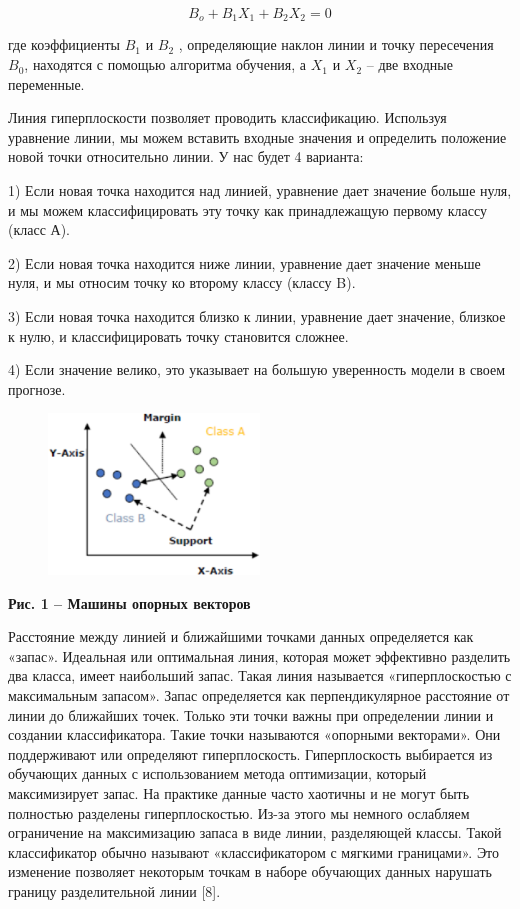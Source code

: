 \begin{equation}
	B_o+B_1X_1+B_2X_2=0
\end{equation}

где коэффициенты $B_1$ и $B_2$ , определяющие наклон линии и точку
пересечения $B_0$, находятся с помощью алгоритма обучения, а $X_1$ и $X_2$ -- две входные переменные.

Линия гиперплоскости позволяет проводить классификацию. Используя
уравнение линии, мы можем вставить входные значения и определить
положение новой точки относительно линии. У нас будет 4 варианта:

1) Если новая точка находится над линией, уравнение дает значение больше
нуля, и мы можем классифицировать эту точку как принадлежащую первому
классу (класс А).

2) Если новая точка находится ниже линии, уравнение дает значение меньше
нуля, и мы относим точку ко второму классу (классу B).

3) Если новая точка находится близко к линии, уравнение дает значение,
близкое к нулю, и классифицировать точку становится сложнее.

4) Если значение велико, это указывает на большую уверенность модели в
своем прогнозе.

\begin{figure}[H]
	\centering
	\includegraphics[width=0.5\textwidth]{assets/110}
	\caption*{}
\end{figure}
{\bfseries Рис. 1 -- Машины опорных векторов}

Расстояние между линией и ближайшими точками данных определяется как
«запас». Идеальная или оптимальная линия, которая может эффективно
разделить два класса, имеет наибольший запас. Такая линия называется
«гиперплоскостью с максимальным запасом». Запас определяется как
перпендикулярное расстояние от линии до ближайших точек. Только эти
точки важны при определении линии и создании классификатора. Такие точки
называются «опорными векторами». Они поддерживают или определяют
гиперплоскость. Гиперплоскость выбирается из обучающих данных с
использованием метода оптимизации, который максимизирует запас. На
практике данные часто хаотичны и не могут быть полностью разделены
гиперплоскостью. Из-за этого мы немного ослабляем ограничение на
максимизацию запаса в виде линии, разделяющей классы. Такой
классификатор обычно называют «классификатором с мягкими границами». Это
изменение позволяет некоторым точкам в наборе обучающих данных нарушать
границу разделительной линии {[}8{]}.

